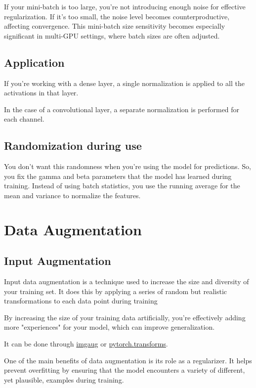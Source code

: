 \documentclass[11pt]{article}
\begin{document}
If your mini-batch is too large, you're not introducing enough noise for effective regularization. If it's too small, the noise level becomes counterproductive, affecting convergence. This mini-batch size sensitivity becomes especially significant in multi-GPU settings, where batch sizes are often adjusted.

\subsection{Application}

If you're working with a dense layer, a single normalization is applied to all the activations in that layer.

In the case of a convolutional layer, a separate normalization is performed for each channel.

\subsection{Randomization during use}

You don't want this randomness when you're using the model for predictions. So, you fix the gamma and beta parameters that the model has learned during training. Instead of using batch statistics, you use the running average for the mean and variance to normalize the features.

\section{Data Augmentation}

\subsection{Input Augmentation}

Input data augmentation is a technique used to increase the size and diversity of your
training set. It does this by applying a series of random but realistic transformations to each data
point during training

By increasing the size of your training data artificially, you're effectively adding more "experiences" for your model, which can improve generalization.

It can be done through \href{https://github.com/aleju/imgaug}{imgaug} or \href{https://pytorch.org/vision/stable/transforms.html}{pytorch.transforms}.

One of the main benefits of data augmentation is its role as a regularizer. It helps prevent overfitting by ensuring that the model encounters a variety of different, yet plausible, examples during training.
\end{document}
